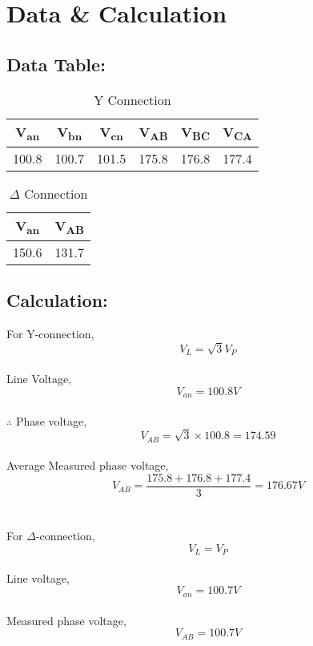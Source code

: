 \documentclass[12pt]{article}
\begin{document}
\section{Data \& Calculation}
\subsection{Data Table:}
\begin{table}[H]
    \centering
    \caption{Y Connection}
    \begin{tabular}{|c|c|c|c|c|c|}
        \hline
        \bf{V\textsubscript{an}} & \bf{V\textsubscript{bn}} & \bf{V\textsubscript{cn}} & \bf{V\textsubscript{AB}} & \bf{V\textsubscript{BC}} & \bf{V\textsubscript{CA}} \\
        \hline
        100.8                    & 100.7                    & 101.5                    & 175.8                    & 176.8                    & 177.4                    \\
        \hline
    \end{tabular}
\end{table}
\begin{table}[H]
    \centering
    \caption{$\Delta$ Connection}
    \begin{tabular}{|c|c|}
        \hline
        \bf{V\textsubscript{an}} & \bf{V\textsubscript{AB}} \\
        \hline
        150.6                    & 131.7                    \\
        \hline
    \end{tabular}
\end{table}

\subsection{Calculation:}
For Y-connection, \[V_L = \sqrt{3}V_P\] \\
Line Voltage, \[V_{an} = 100.8V\] \\
$\therefore$ Phase voltage, \[V_{AB} = \sqrt{3}\times 100.8 = 174.59\] \\
Average Measured phase voltage, \[V_{AB} = \frac{175.8+176.8+177.4}{3} = 176.67V\] \\\\
For $\Delta$-connection, \[V_L = V_P\] \\
Line voltage, \[V_{an} = 100.7V\] \\
Measured phase voltage, \[V_{AB} = 100.7V\] \\
\end{document}
